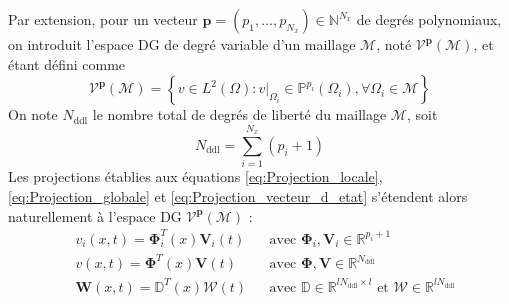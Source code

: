 \documentclass[11pt, a4paper, oneside]{report}
\newcommand{\restricdynamic}[2]{\left.#1\right\vert_{#2}}
\begin{document}
Par extension, pour un vecteur $\mathbf{p} = (p_1, \dots, p_{N_x}) \in \mathbb{N}^{N_x}$ de degrés polynomiaux, on introduit l'espace DG de degré variable d'un maillage $\mathcal{M}$, noté $\mathcal{V}^{\mathbf{p}}(\mathcal{M})$, et étant défini comme
\begin{equation}
    \mathcal{V}^{\mathbf{p}}(\mathcal{M}) = \left \{ v \in L^2(\Omega) : \restricdynamic{v}{\Omega_i} \in \mathbb{P}^{p_i}(\Omega_i), \forall \Omega_i \in \mathcal{M} \right \}
\end{equation}
On note $N_\text{ddl}$ le nombre total de degrés de liberté du maillage $\mathcal{M}$, soit
\begin{equation}
    N_\text{ddl} = \sum_{i = 1}^{N_x} (p_i + 1)
\end{equation}
Les projections établies aux équations \eqref{eq:Projection_locale}, \eqref{eq:Projection_globale} et \eqref{eq:Projection_vecteur_d_etat} s'étendent alors naturellement à l'espace DG $\mathcal{V}^{\mathbf{p}}(\mathcal{M})$ :
\begin{equation} \label{eq:Projection_p_variable}
    \begin{aligned}
        &v_i(x, t) = \bm{\Phi}_i^T(x) \bm{V}_i(t)   &&\text{avec } \bm{\Phi}_i, \bm{V}_i \in \mathbb{R}^{p_i+1} \\
        &v(x, t) = \bm{\Phi}^T(x) \bm{V}(t)         &&\text{avec } \bm{\Phi}, \bm{V} \in \mathbb{R}^{N_\text{ddl}} \\
        &\bm{W}(x, t) = \mathbb{D}^T(x) \bm{\mathcal{W}}(t) &&\text{avec } \mathbb{D} \in \mathbb{R}^{l N_\text{ddl} \times l} \text{ et } \bm{\mathcal{W}} \in \mathbb{R}^{l N_\text{ddl}}
    \end{aligned}
\end{equation}
\end{document}
